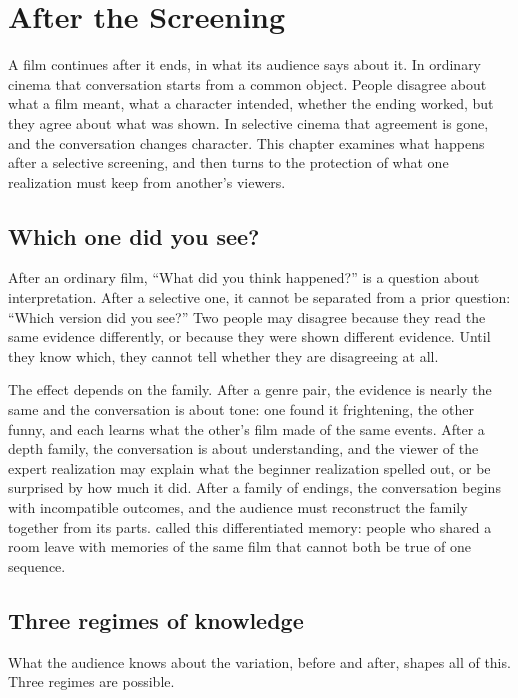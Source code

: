 \chapter{After the Screening}\label{ch:after-screening}

A film continues after it ends, in what its audience says about it. In ordinary cinema that conversation starts from a common object. People disagree about what a film meant, what a character intended, whether the ending worked, but they agree about what was shown. In selective cinema that agreement is gone, and the conversation changes character. This chapter examines what happens after a selective screening, and then turns to the protection of what one realization must keep from another's viewers.

\section{Which one did you see?}

After an ordinary film, ``What did you think happened?'' is a question about interpretation. After a selective one, it cannot be separated from a prior question: ``Which version did you see?'' Two people may disagree because they read the same evidence differently, or because they were shown different evidence. Until they know which, they cannot tell whether they are disagreeing at all.

The effect depends on the family. After a genre pair, the evidence is nearly the same and the conversation is about tone: one found it frightening, the other funny, and each learns what the other's film made of the same events. After a depth family, the conversation is about understanding, and the viewer of the expert realization may explain what the beginner realization spelled out, or be surprised by how much it did. After a family of endings, the conversation begins with incompatible outcomes, and the audience must reconstruct the family together from its parts.  called this differentiated memory: people who shared a room leave with memories of the same film that cannot both be true of one sequence.

\section{Three regimes of knowledge}

What the audience knows about the variation, before and after, shapes all of this. Three regimes are possible.

